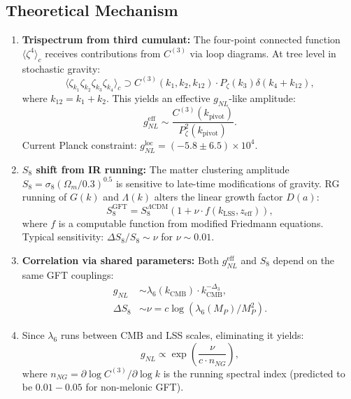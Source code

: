 \documentclass[12pt,a4paper]{article}
\begin{document}
\subsection{Theoretical Mechanism}

\begin{enumerate}
\item \textbf{Trispectrum from third cumulant:} The four-point connected function \(\langle \zeta^4 \rangle_c\) receives contributions from \(C^{(3)}\) via loop diagrams. At tree level in stochastic gravity:
\begin{equation}
\langle \zeta_{k_1} \zeta_{k_2} \zeta_{k_3} \zeta_{k_4} \rangle_c \supset C^{(3)}(k_1, k_2, k_{12}) \cdot P_\zeta(k_3) \delta(k_4 + k_{12}),
\end{equation}
where \(k_{12} = k_1 + k_2\). This yields an effective \(g_{NL}\)-like amplitude:
\begin{equation}
g_{NL}^{\text{eff}} \sim \frac{C^{(3)}(k_{\text{pivot}})}{P_\zeta^2(k_{\text{pivot}})}.
\end{equation}
Current Planck constraint: \(g_{NL}^{\text{loc}} = (-5.8 \pm 6.5) \times 10^4\).

\item \textbf{\(S_8\) shift from IR running:} The matter clustering amplitude \(S_8 = \sigma_8(\Omega_m/0.3)^{0.5}\) is sensitive to late-time modifications of gravity. RG running of \(G(k)\) and \(\Lambda(k)\) alters the linear growth factor \(D(a)\):
\begin{equation}
S_8^{\text{GFT}} = S_8^{\Lambda\text{CDM}} (1 + \nu \cdot f(k_{\text{LSS}}, z_{\text{eff}})),
\end{equation}
where \(f\) is a computable function from modified Friedmann equations. Typical sensitivity: \(\Delta S_8/S_8 \sim \nu\) for \(\nu \sim 0.01\).

\item \textbf{Correlation via shared parameters:} Both \(g_{NL}^{\text{eff}}\) and \(S_8\) depend on the same GFT couplings:
\begin{align}
g_{NL} &\sim \lambda_6(k_{\text{CMB}}) \cdot k_{\text{CMB}}^{-\Delta_3}, \\
\Delta S_8 &\sim \nu = c\log(\lambda_6(M_P)/M_P^2).
\end{align}

\item Since \(\lambda_6\) runs between CMB and LSS scales, eliminating it yields:
\begin{equation}
g_{NL} \propto \exp\left(\frac{\nu}{c \cdot n_{NG}}\right),
\end{equation}
where \(n_{NG} = \partial\log C^{(3)}/\partial\log k\) is the running spectral index (predicted to be \(0.01-0.05\) for non-melonic GFT).
\end{enumerate}
\end{document}
